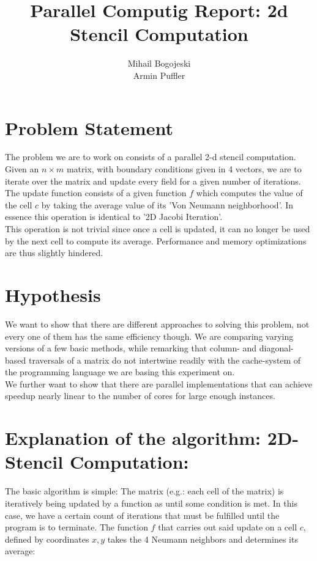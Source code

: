 \documentclass[11pt]{article}
\title{\textbf{Parallel Computig Report: 2d Stencil Computation}}
\author{Mihail Bogojeski\\
		Armin Puffler}
\date{}
\begin{document}
\maketitle

\section{Problem Statement}

The problem we are to work on consists of a parallel 2-d stencil computation.\\
Given an $n \times m$ matrix, with boundary conditions given in 4 vectors, we are to iterate over the matrix and update every field for a given number of iterations.\\ 
The update function consists of a given function $f$ which computes the value of the cell $c$ by taking the average value of its 'Von Neumann neighborhood'. In essence this operation is identical to '2D Jacobi Iteration'.\\
This operation is not trivial since once a cell is updated, it can no longer be used by the next cell to compute its average. Performance and memory optimizations are thus slightly hindered.\\
 
\section{Hypothesis}

We want to show that there are different approaches to solving this problem, not every one of them has the same efficiency though. We are comparing varying versions of a few basic methods, while remarking that column- and diagonal-based traversals of a matrix do not intertwine readily with the cache-system of the programming language we are basing this experiment on.\\
We further want to show that there are parallel implementations that can achieve speedup nearly linear to the number of cores for large enough instances.

\section{Explanation of the algorithm: 2D-Stencil Computation: }

The basic algorithm is simple: The matrix (e.g.: each cell of the matrix) is iteratively being updated by a function as until some condition is met. In this case, we have a certain count of iterations that must be fulfilled until the program is to terminate.
The function $f$ that carries out said update on a cell $c$, defined by coordinates $x, y$ takes the 4 Neumann neighbors and determines its average:
\end{document}
